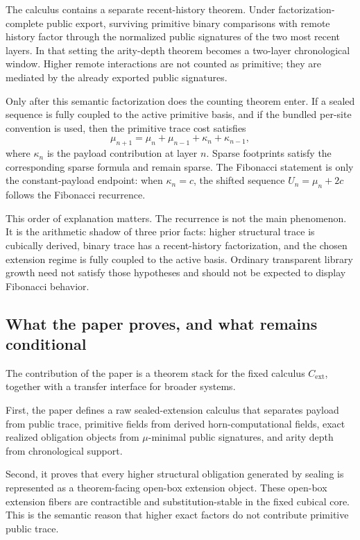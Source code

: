 The calculus contains a separate recent-history theorem.  Under
factorization-complete public export, surviving primitive binary comparisons with
remote history factor through the normalized public signatures of the two most
recent layers.  In that setting the arity-depth theorem becomes a two-layer
chronological window.  Higher remote interactions are not counted as primitive;
they are mediated by the already exported public signatures.

Only after this semantic factorization does the counting theorem enter.  If a
sealed sequence is fully coupled to the active primitive basis, and if the
bundled per-site convention is used, then the primitive trace cost satisfies
\[
  \mu_{n+1} = \mu_n + \mu_{n-1} + \kappa_n + \kappa_{n-1},
\]
where \(\kappa_n\) is the payload contribution at layer \(n\).  Sparse footprints
satisfy the corresponding sparse formula and remain sparse.  The Fibonacci
statement is only the constant-payload endpoint: when \(\kappa_n=c\), the shifted
sequence \(U_n=\mu_n+2c\) follows the Fibonacci recurrence.

This order of explanation matters.  The recurrence is not the main phenomenon.
It is the arithmetic shadow of three prior facts: higher structural trace is
cubically derived, binary trace has a recent-history factorization, and the
chosen extension regime is fully coupled to the active basis.  Ordinary
transparent library growth need not satisfy those hypotheses and should not be
expected to display Fibonacci behavior.

\subsection{What the paper proves, and what remains conditional}

The contribution of the paper is a theorem stack for the fixed calculus
\(C_{\mathrm{ext}}\), together with a transfer interface for broader systems.

First, the paper defines a raw sealed-extension calculus that separates payload
from public trace, primitive fields from derived horn-computational fields, exact
realized obligation objects from \(\mu\)-minimal public signatures, and arity
depth from chronological support.

Second, it proves that every higher structural obligation generated by sealing is
represented as a theorem-facing open-box extension object.  These open-box
extension fibers are contractible and substitution-stable in the fixed cubical
core.  This is the semantic reason that higher exact factors do not contribute
primitive public trace.


